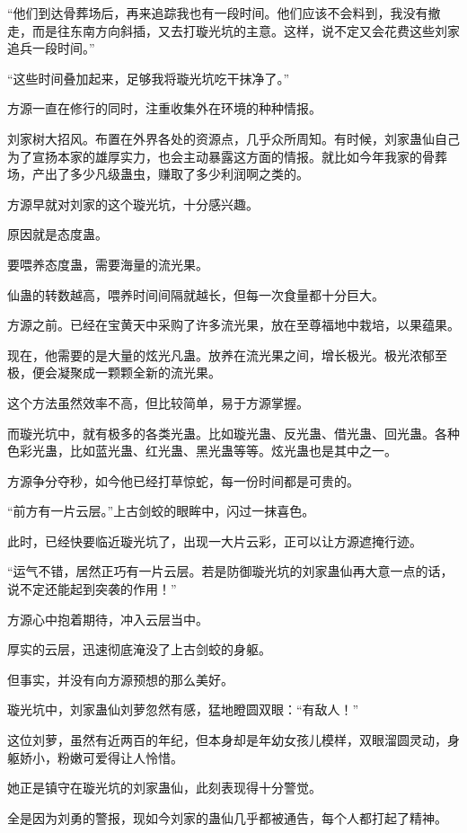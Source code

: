 \begin{this_body}
“他们到达骨葬场后，再来追踪我也有一段时间。他们应该不会料到，我没有撤走，而是往东南方向斜插，又去打璇光坑的主意。这样，说不定又会花费这些刘家追兵一段时间。”

“这些时间叠加起来，足够我将璇光坑吃干抹净了。”

方源一直在修行的同时，注重收集外在环境的种种情报。

刘家树大招风。布置在外界各处的资源点，几乎众所周知。有时候，刘家蛊仙自己为了宣扬本家的雄厚实力，也会主动暴露这方面的情报。就比如今年我家的骨葬场，产出了多少凡级蛊虫，赚取了多少利润啊之类的。

方源早就对刘家的这个璇光坑，十分感兴趣。

原因就是态度蛊。

要喂养态度蛊，需要海量的流光果。

仙蛊的转数越高，喂养时间间隔就越长，但每一次食量都十分巨大。

方源之前。已经在宝黄天中采购了许多流光果，放在至尊福地中栽培，以果蕴果。

现在，他需要的是大量的炫光凡蛊。放养在流光果之间，增长极光。极光浓郁至极，便会凝聚成一颗颗全新的流光果。

这个方法虽然效率不高，但比较简单，易于方源掌握。

而璇光坑中，就有极多的各类光蛊。比如璇光蛊、反光蛊、借光蛊、回光蛊。各种色彩光蛊，比如蓝光蛊、红光蛊、黑光蛊等等。炫光蛊也是其中之一。

方源争分夺秒，如今他已经打草惊蛇，每一份时间都是可贵的。

“前方有一片云层。”上古剑蛟的眼眸中，闪过一抹喜色。

此时，已经快要临近璇光坑了，出现一大片云彩，正可以让方源遮掩行迹。

“运气不错，居然正巧有一片云层。若是防御璇光坑的刘家蛊仙再大意一点的话，说不定还能起到突袭的作用！”

方源心中抱着期待，冲入云层当中。

厚实的云层，迅速彻底淹没了上古剑蛟的身躯。

但事实，并没有向方源预想的那么美好。

璇光坑中，刘家蛊仙刘萝忽然有感，猛地瞪圆双眼：“有敌人！”

这位刘萝，虽然有近两百的年纪，但本身却是年幼女孩儿模样，双眼溜圆灵动，身躯娇小，粉嫩可爱得让人怜惜。

她正是镇守在璇光坑的刘家蛊仙，此刻表现得十分警觉。

全是因为刘勇的警报，现如今刘家的蛊仙几乎都被通告，每个人都打起了精神。


\end{this_body}
